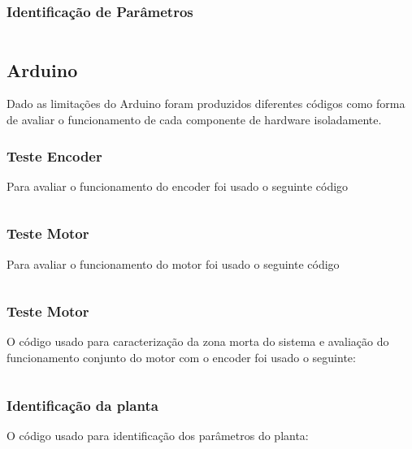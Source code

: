 \documentclass[a4paper,11pt]{article}
\begin{document}
\newpage
\subsubsection*{Identificação de Parâmetros}
\inputminted[xleftmargin=15pt,linenos,frame=single,framesep=5pt,breaklines=true]{matlab}{../matlab/identification.m}

\newpage
\subsection*{Arduino}
Dado as limitações do Arduino foram produzidos diferentes códigos como forma de avaliar o funcionamento de cada componente de hardware isoladamente.

\subsubsection*{Teste Encoder}
Para avaliar o funcionamento do encoder foi usado o seguinte código
\inputminted[xleftmargin=15pt,linenos,frame=single,framesep=5pt,breaklines=true]{c++}{../arduino/test_enconder/test_enconder.ino}

\newpage
\subsubsection*{Teste Motor}
Para avaliar o funcionamento do motor foi usado o seguinte código
\inputminted[xleftmargin=15pt,linenos,frame=single,framesep=5pt,breaklines=true]{c++}{../arduino/test_dcmotor/test_dcmotor.ino}

\newpage
\subsubsection*{Teste Motor}
O código usado para caracterização da zona morta do sistema e avaliação do funcionamento conjunto do motor com o encoder foi usado o seguinte:
\inputminted[xleftmargin=15pt,linenos,frame=single,framesep=5pt,breaklines=true]{c++}{../arduino/test_dcmotor_characterization/test_dcmotor_characterization.ino}

\newpage
\subsubsection*{Identificação da planta}
O código usado para identificação dos parâmetros do planta:
\inputminted[xleftmargin=15pt,linenos,frame=single,framesep=5pt,breaklines=true]{c++}{../arduino/test_dcmotor_pulses/test_dcmotor_pulses.ino}
\end{document}
